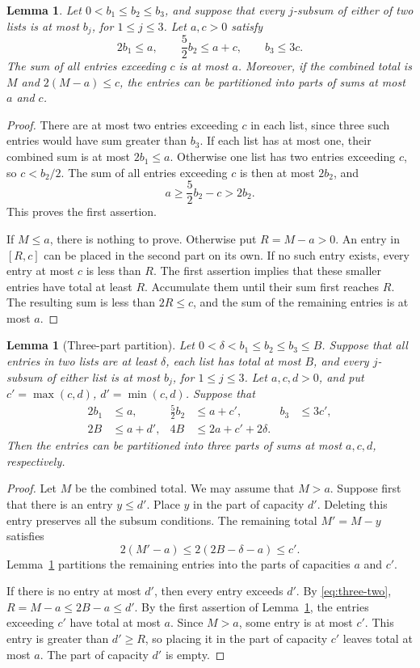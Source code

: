 \documentclass[11pt,reqno]{amsart}
\newtheorem{lemma}[theorem]{Lemma}
\theoremstyle{definition}
\theoremstyle{remark}
\numberwithin{equation}{section}
\begin{document}
\begin{lemma}\label{lem:two-bins}
Let $0<b_1\le b_2\le b_3$, and suppose that every $j$-subsum of either
of two lists is at most $b_j$, for $1\le j\le3$. Let $a,c>0$ satisfy
\begin{equation}\label{eq:large-items}
 2b_1\le a,\qquad \frac52b_2\le a+c,\qquad b_3\le3c.
\end{equation}
The sum of all entries exceeding $c$ is at most $a$. Moreover, if the
combined total is $M$ and $2(M-a)\le c$, the entries can be partitioned
into parts of sums at most $a$ and $c$.
\end{lemma}
\begin{proof}
There are at most two entries exceeding $c$ in each list, since three
such entries would have sum greater than $b_3$. If each list has at most
one, their combined sum is at most $2b_1\le a$. Otherwise one list has
two entries exceeding $c$, so $c<b_2/2$. The sum of all entries exceeding
$c$ is then at most $2b_2$, and
\[
 a\ge\frac52b_2-c>2b_2.
\]
This proves the first assertion.

If $M\le a$, there is nothing to prove. Otherwise put $R=M-a>0$.
An entry in $[R,c]$ can be placed in the second part on its own. If no
such entry exists, every entry at most $c$ is less than $R$. The first
assertion implies that these smaller entries have total at least $R$.
Accumulate them until their sum first reaches $R$. The resulting sum is
less than $2R\le c$, and the sum of the remaining entries is at most $a$.
\end{proof}

\begin{lemma}[Three-part partition]\label{lem:three-bins}
Let $0<\delta<b_1\le b_2\le b_3\le B$. Suppose that all entries in
two lists are at least $\delta$, each list has total at most $B$, and
every $j$-subsum of either list is at most $b_j$, for $1\le j\le3$.
Let $a,c,d>0$, and put $c'=\max(c,d)$, $d'=\min(c,d)$.
Suppose that
\begin{align}
 2b_1&\le a,& \frac52b_2&\le a+c',& b_3&\le3c',\label{eq:three-one}\\
 2B&\le a+d',& 4B&\le2a+c'+2\delta.\label{eq:three-two}
\end{align}
Then the entries can be partitioned into three parts of sums at most
$a,c,d$, respectively.
\end{lemma}
\begin{proof}
Let $M$ be the combined total. We may assume that $M>a$.
Suppose first that there is an entry $y\le d'$. Place $y$ in the part of
capacity $d'$. Deleting this entry preserves all the subsum conditions.
The remaining total $M'=M-y$ satisfies
\[
 2(M'-a)\le 2(2B-\delta-a)\le c'.
\]
Lemma~\ref{lem:two-bins} partitions the remaining entries into the parts
of capacities $a$ and $c'$.

If there is no entry at most $d'$, then every entry exceeds $d'$.
By \eqref{eq:three-two}, $R=M-a\le2B-a\le d'$. By the first assertion of
Lemma~\ref{lem:two-bins}, the entries exceeding $c'$ have total at most
$a$. Since $M>a$, some entry is at most $c'$. This entry is greater than
$d'\ge R$, so placing it in the part of capacity $c'$ leaves total at
most $a$. The part of capacity $d'$ is empty.
\end{proof}
\end{document}
